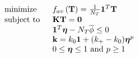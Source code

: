\begin{equation}
	\begin{tabular}{ll}
		$\text{minimize}$  & $f_{av}\left({\mathbf{T}}\right)=\frac{1}{N_T}\mathbf{1}^T\mathbf{T}$                                                                                     \\
		\text{subject to } & $\mathbf{K}\mathbf{T}=\mathbf{0}$                                                                   \\
		& $\mathbf{1}^T\boldsymbol{\eta}-N_T\overline{\phi}\leq0$ \\
		& $\mathbf{k}=k_0\mathbf{1}+(k_+-k_0)\boldsymbol{\eta}^p$                                       \\
		& $0\leq\boldsymbol{\eta}\leq 1\text{ and } p\geq 1$
	\end{tabular}\label{Implementation-SIMP-Optimization-Problem}
\end{equation}